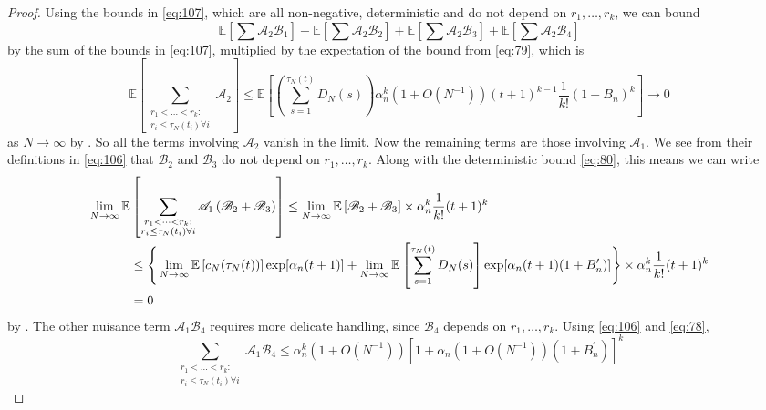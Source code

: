\documentclass{article}
\newcommand{\E}{\mathbb{E}}
\newcommand{\1}[1]{\mathbbm{1}_{#1}}
\begin{document}
\begin{proof}
Using the bounds in \eqref{eq:107}, which are all non-negative, deterministic and do not depend on $r_1,\dots,r_k$, we can bound
\begin{equation}
\E\left[ \sum \mathscr{A}_2 \mathscr{B}_1 \right] + \E\left[ \sum \mathscr{A}_2 \mathscr{B}_2 \right] + \E\left[ \sum \mathscr{A}_2 \mathscr{B}_3 \right] + \E\left[ \sum \mathscr{A}_2 \mathscr{B}_4 \right]
\end{equation}
by the sum of the bounds in \eqref{eq:107}, multiplied by the expectation of the bound from \eqref{eq:79}, which is
\begin{equation}
\E\left[ \sum_{\substack{r_1 <\dots< r_k :\\ r_i \leq \tau_N(t_i) \forall i}} \mathscr{A}_2 \right]
\leq \E\left[ \left( \sum_{s=1}^{\tau_N(t)} D_N(s) \right) \alpha_n^k (1+O(N^{-1})) (t+1)^{k-1} \frac{1}{k!} (1+B_n)^k \right]
\longrightarrow 0
\end{equation}
as $N\to\infty$ by \citet[Equation (3.4)]{brown2021}. 
So all the terms involving $\mathscr{A}_2$ vanish in the limit.
Now the remaining terms are those involving $\mathscr{A}_1$.
We see from their definitions in \eqref{eq:106} that $\mathscr{B}_2$ and $\mathscr{B}_3$ do not depend on $r_1,\dots, r_k$. Along with the deterministic bound \eqref{eq:80}, this means we can write
\begin{align}
\lim_{N\to\infty} \E&\left[ \sum_{\substack{r_1 <\dots< r_k :\\ r_i \leq \tau_N(t_i) \forall i}} \mathscr{A}_1 \left( \mathscr{B}_2 + \mathscr{B}_3 \right) \right]
\leq \lim_{N\to\infty} \E\left[ \mathscr{B}_2 + \mathscr{B}_3 \right] \times
\alpha_n^k \frac{1}{k!} (t+1)^k \notag\\
&\leq \Bigg\{
\lim_{N\to\infty} \E\left[ c_N(\tau_N(t)) \right] \exp[ \alpha_n (t+1) ]
+ \lim_{N\to\infty} \E\left[ \sum_{s=1}^{\tau_N(t)} D_N(s) \right] 
\exp[ \alpha_n (t+1) (1+B_n^\prime) ]
\Bigg\} \times \alpha_n^k \frac{1}{k!} (t+1)^k \notag\\
&=0
\end{align}
by \citet[Equations (3.3)--(3.4)]{brown2021}.
The other nuisance term $\mathscr{A}_1 \mathscr{B}_4$ requires more delicate handling, since $\mathscr{B}_4$ depends on $r_1, \dots, r_k$. Using \eqref{eq:106} and \eqref{eq:78},
\begin{equation}
\sum_{\substack{r_1 <\dots< r_k :\\ r_i \leq \tau_N(t_i) \forall i}} \mathscr{A}_1 \mathscr{B}_4
\leq \alpha_n^k (1+O(N^{-1}))
\left[ 1 + \alpha_n (1+O(N^{-1})) (1 + B_n^\prime) \right]^k

\end{equation}
\end{proof}
\end{document}
